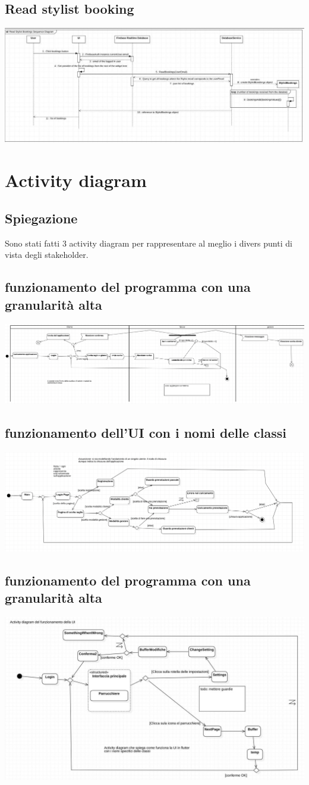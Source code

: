 \documentclass{article}
\begin{document}
\subsection{Read stylist booking}
\includegraphics[scale=0.45]{ImmaginiUML/Sequence3.jpg}

\newpage
\section{Activity diagram} 
\subsection{Spiegazione}
Sono stati fatti 3 activity diagram per rappresentare al meglio 
i divers punti di vista degli stakeholder.
\subsection{funzionamento del programma con una granularità alta}
\includegraphics[scale = 0.38]{ImmaginiUML/Activity1.png}
\subsection{funzionamento dell'UI con i nomi delle classi}
\includegraphics[scale = 0.45]{ImmaginiUML/Activity2.png}
\subsection{funzionamento del programma con una granularità alta}
\includegraphics[scale = 0.5]{ImmaginiUML/Activity3.jpg}
\end{document}
